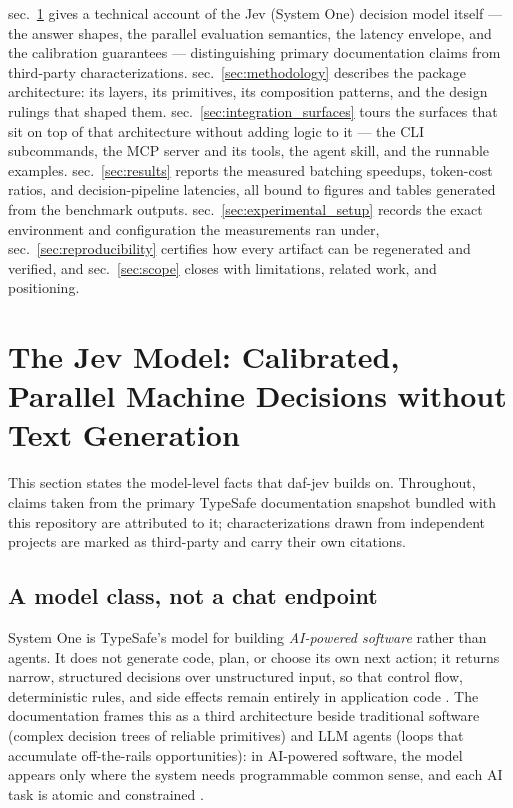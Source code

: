 \documentclass[
  english,
]{article}
\begin{document}
sec.~\ref{sec:jev_model} gives a technical account of the Jev (System
One) decision model itself --- the answer shapes, the parallel
evaluation semantics, the latency envelope, and the calibration
guarantees --- distinguishing primary documentation claims from
third-party characterizations. sec.~\ref{sec:methodology} describes the
package architecture: its layers, its primitives, its composition
patterns, and the design rulings that shaped them.
sec.~\ref{sec:integration_surfaces} tours the surfaces that sit on top
of that architecture without adding logic to it --- the CLI subcommands,
the MCP server and its tools, the agent skill, and the runnable
examples. sec.~\ref{sec:results} reports the measured batching speedups,
token-cost ratios, and decision-pipeline latencies, all bound to figures
and tables generated from the benchmark outputs.
sec.~\ref{sec:experimental_setup} records the exact environment and
configuration the measurements ran under, sec.~\ref{sec:reproducibility}
certifies how every artifact can be regenerated and verified, and
sec.~\ref{sec:scope} closes with limitations, related work, and
positioning.

\newpage

\section{The Jev Model: Calibrated, Parallel Machine Decisions without
Text Generation}\label{sec:jev_model}

This section states the model-level facts that daf-jev builds on.
Throughout, claims taken from the primary TypeSafe documentation
snapshot bundled with this repository are attributed to it;
characterizations drawn from independent projects are marked as
third-party and carry their own citations.

\subsection{A model class, not a chat
endpoint}\label{a-model-class-not-a-chat-endpoint}

System One is TypeSafe's model for building \emph{AI-powered software}
rather than agents. It does not generate code, plan, or choose its own
next action; it returns narrow, structured decisions over unstructured
input, so that control flow, deterministic rules, and side effects
remain entirely in application code \citep{typesafe2026systemone}. The
documentation frames this as a third architecture beside traditional
software (complex decision trees of reliable primitives) and LLM agents
(loops that accumulate off-the-rails opportunities): in AI-powered
software, the model appears only where the system needs programmable
common sense, and each AI task is atomic and constrained
\citep{typesafe2026systemone}.
\end{document}
